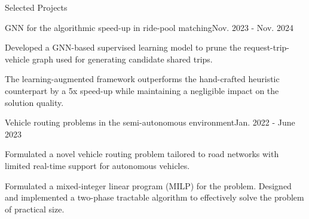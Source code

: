 \documentclass{resume} %
\begin{document}
\begin{rSection}{Selected Projects}
\begin{rSubsection}{GNN for the algorithmic speed-up in ride-pool matching}{Nov. 2023 - Nov. 2024}{}{}
\item Developed a GNN-based supervised learning model to prune the request-trip-vehicle graph used for generating candidate shared trips.
\item The learning-augmented framework outperforms the hand-crafted heuristic counterpart by a 5x speed-up while maintaining a negligible impact on the solution quality.
\end{rSubsection}


\begin{rSubsection}{Vehicle routing problems in the semi-autonomous environment}{Jan. 2022 - June 2023}{}{}
\item Formulated a novel vehicle routing problem tailored to road networks with limited real-time support for autonomous vehicles.
\item Formulated a mixed-integer linear program (MILP) for the problem. Designed and implemented a two-phase tractable algorithm to effectively solve the problem of practical size.
\end{rSubsection}



\end{rSection}
\end{document}
